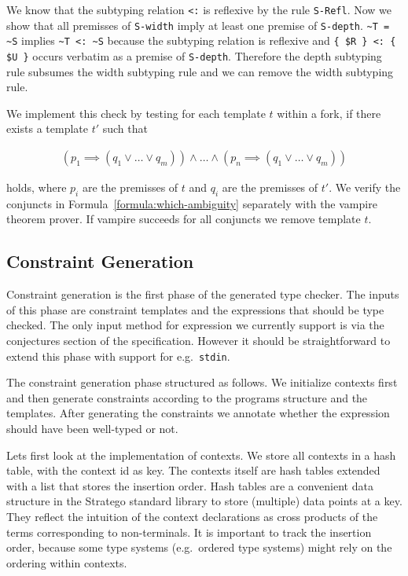 We know that the subtyping relation \verb|<:| is reflexive by the rule
\verb|S-Refl|. Now we show that all premisses of \verb|S-width| imply
at least one premise of \verb|S-depth|. \verb|~T = ~S| implies
\verb|~T <: ~S| because the subtyping relation is reflexive and
\verb|{ $R } <: { $U }| occurs verbatim as a premise of
\verb|S-depth|. Therefore the depth subtyping rule subsumes the width
subtyping rule and we can remove the width subtyping rule.

We implement this check by testing for each template $t$ within a
fork, if there exists a template $t'$ such that

\begin{align}
  (p_1 \implies (q_1 \lor \dots \lor q_m)) \land \dots \land (p_n \implies
  (q_1 \lor \dots \lor q_m))
\label{formula:which-ambiguity}
\end{align}

holds, where $p_i$ are the premisses of $t$ and $q_i$ are the
premisses of $t'$. We verify the conjuncts in
Formula~\ref{formula:which-ambiguity} separately with the vampire
theorem prover. If vampire succeeds for all conjuncts we remove
template $t$. 

\subsection{Constraint Generation}
\label{sec:constr-gener}
Constraint generation is the first phase of the generated type
checker. The inputs of this phase are constraint templates and the
expressions that should be type checked. The only input method for
expression we currently support is via the conjectures section of the
specification. However it should be straightforward to extend this
phase with support for e.g.\ \verb|stdin|.

The constraint generation phase structured as follows. We initialize
contexts first and then generate constraints according to the programs
structure and the templates. After generating the constraints we
annotate whether the expression should have been well-typed or not.

Lets first look at the implementation of contexts. We store all
contexts in a hash table, with the context id as key. The contexts
itself are hash tables extended with a list that stores the insertion
order. Hash tables are a convenient data structure in the Stratego
standard library to store (multiple) data points at a key. They
reflect the intuition of the context declarations as cross products of
the terms corresponding to non-terminals. It is important to track the
insertion order, because some type systems (e.g.\ ordered type
systems) might rely on the ordering within contexts.

